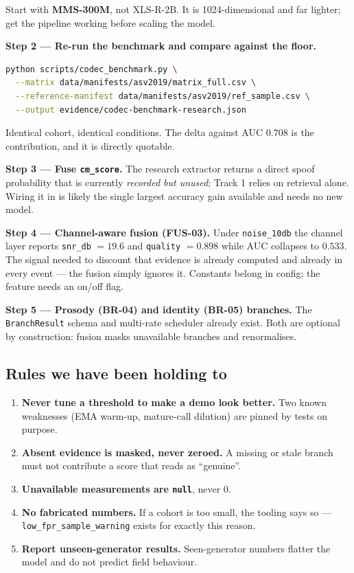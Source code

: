 \documentclass[11pt,a4paper]{article}
\newcommand{\code}[1]{\texttt{\small #1}}
\begin{document}
Start with \textbf{MMS-300M}, not XLS-R-2B. It is 1024-dimensional and far
lighter; get the pipeline working before scaling the model.

\textbf{Step 2 --- Re-run the benchmark and compare against the floor.}

\begin{lstlisting}[language=bash]
python scripts/codec_benchmark.py \
  --matrix data/manifests/asv2019/matrix_full.csv \
  --reference-manifest data/manifests/asv2019/ref_sample.csv \
  --output evidence/codec-benchmark-research.json
\end{lstlisting}

Identical cohort, identical conditions. The delta against AUC $0.708$ is the
contribution, and it is directly quotable.

\textbf{Step 3 --- Fuse \code{cm\_score}.} The research extractor returns a direct
spoof probability that is currently \emph{recorded but unused}; Track 1 relies on
retrieval alone. Wiring it in is likely the single largest accuracy gain available
and needs no new model.

\textbf{Step 4 --- Channel-aware fusion (FUS-03).} Under \code{noise\_10db} the
channel layer reports \code{snr\_db} $= 19.6$ and \code{quality} $= 0.898$ while AUC
collapses to $0.533$. The signal needed to discount that evidence is already
computed and already in every event --- the fusion simply ignores it. Constants
belong in config; the feature needs an on/off flag.

\textbf{Step 5 --- Prosody (BR-04) and identity (BR-05) branches.} The
\code{BranchResult} schema and multi-rate scheduler already exist. Both are
optional by construction: fusion masks unavailable branches and renormalises.

\subsection{Rules we have been holding to}

\begin{enumerate}[leftmargin=1.6em]
\item \textbf{Never tune a threshold to make a demo look better.} Two known
weaknesses (EMA warm-up, mature-call dilution) are pinned by tests on purpose.
\item \textbf{Absent evidence is masked, never zeroed.} A missing or stale branch
must not contribute a score that reads as ``genuine''.
\item \textbf{Unavailable measurements are \code{null}}, never $0$.
\item \textbf{No fabricated numbers.} If a cohort is too small, the tooling says so
--- \code{low\_fpr\_sample\_warning} exists for exactly this reason.
\item \textbf{Report unseen-generator results.} Seen-generator numbers flatter the
model and do not predict field behaviour.
\end{enumerate}
\end{document}

